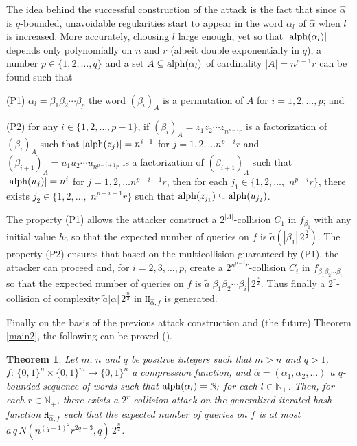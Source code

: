 \documentclass[submission,copyright,creativecommons]{eptcs}
\newcommand{\N}{\mathbb N}
\newcommand{\alp}{{\rm alph}}
\newcommand{\h}{\mathtt H}
\newcounter{dep}
\newcounter{dol}
\newenvironment{yks}
{
\setlength{\parskip}{1pt}
\begin{list}
{}{\usecounter{dol}\setlength{\topsep}{0pt}\setlength{\rightmargin}{\leftmargin}\setlength{\parsep}{0pt}\setlength{\itemsep}{0pt}}
}
{\end{list}}
\newtheorem{theorem}{Theorem}
\begin{document}
The idea behind the successful construction of the attack is the fact that since
$\hat\alpha$ is $q$-bounded, unavoidable regularities start to appear
in the word $\alpha_l$ of $\hat\alpha$ when $l$ is increased. More
accurately, choosing $l$ large enough, yet so that $|\alp(\alpha_l)|$ depends only
polynomially on $n$ and $r$ (albeit double exponentially in $q$), a number $p\in\{1,2,\ldots,q\}$ and a set $A\subseteq
\alp(\alpha_l)$ of cardinality $|A|=n^{p-1}r$ can be found such that
\begin{yks}
\item[(P1)] $\alpha_l=\beta_1\beta_2\cdots\beta_p$ the word 
  $(\beta_i)_A$ is a permutation of $A$ for $i=1,2,\ldots,p$; and
\item[(P2)] for any $i\in\{1,2,\ldots,p-1\}$, if
  $(\beta_i)_A=z_1z_2\cdots z_{n^{p-i}r}$ is a factorization of
  $(\beta_i)_A$ such that $|\alp(z_j)|=n^{i-1}$ for $j=1,2,\ldots
  n^{p-i}r$ and $(\beta_{i+1})_A=u_1u_2\cdots u_{n^{p-i+1}r}$ is a
  factorization of $(\beta_{i+1})_A$ such that $|\alp(u_j)|=n^i$
  for $j=1,2,\ldots n^{p-i+1}r$, then for each $j_1\in\{1,2,\ldots,$
  $n^{p-i}r\}$, there exists $j_2\in\{1,2,\ldots,$ $n^{p-i-1}r\}$ such
  that $\alp(z_{j_1})\subseteq \alp(u_{j_2})$.
\end{yks}

The property (P1) allows the attacker construct a $2^{|A|}$-collision $C_1$ in
$f_{\beta_1}$ with any initial value $h_0$ so that the expected number
of queries on $f$ is $\tilde a(|\beta_1|\,2^{\frac{n}{2}})$. The property (P2) ensures that based on the multicollision  guaranteed by (P1),
the attacker can proceed and, for $i=2,3,\ldots,p$, create a $2^{n^{p-i}r}$-collision $C_{i}$ in $f_{\beta_1\beta_2\cdots \beta_{i}}$ so that the expected number of queries on $f$ is $\tilde a|\beta_1\beta_2\cdots\beta_{i}|\,2^{\frac{n}{2}}$. Thus finally a $2^r$-collision of complexity $\tilde a|\alpha|\,2^{\frac{n}{2}}$ in 
$\h_{\hat{\alpha},f}$ is generated.

Finally on the basis of the previous attack construction and (the future) Theorem \ref{main2}, the following can be proved  (\cite{KKV}).

\begin{theorem}\label{main3}
Let $m,\,n$ and $q$ be positive integers such that $m > n$ and $q>1$, $f:\,\{0,1\}^n\times \{0,1\}^m \rightarrow \{0,1\}^n$ a compression function, and $\hat\alpha=(\alpha_1,\alpha_2,\ldots)$ a $q$-bounded sequence of words such that $\alp(\alpha_l)=\N_l$ for each
$l\in\N_+$. Then, for each $r\in\N_+$, there exists a $2^r$-collision attack on the generalized iterated hash function $\h_{\hat{\alpha},f}$ such that the expected number of queries on $f$ is at most $\tilde a\,q\,N(n^{(q-1)^2}r^{2q-3},q)\,2^{\frac{n}{2}}$.
\end{theorem}
\end{document}
